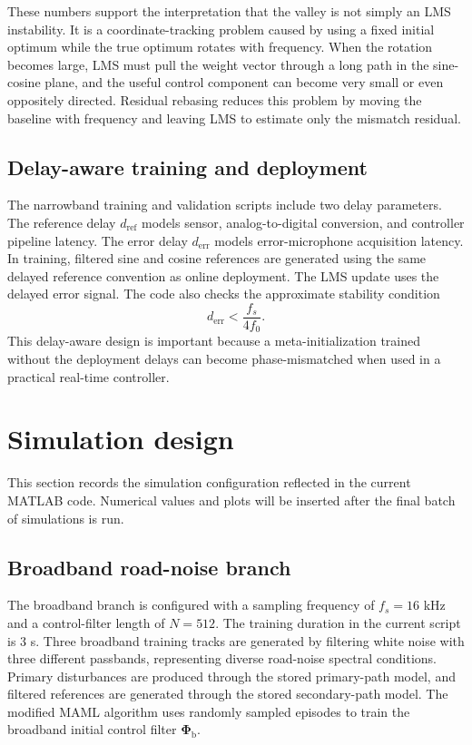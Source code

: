 \documentclass{internoise2026}
\begin{document}
These numbers support the interpretation that the valley is not simply an LMS instability. It is a coordinate-tracking problem caused by using a fixed initial optimum while the true optimum rotates with frequency. When the rotation becomes large, LMS must pull the weight vector through a long path in the sine-cosine plane, and the useful control component can become very small or even oppositely directed. Residual rebasing reduces this problem by moving the baseline with frequency and leaving LMS to estimate only the mismatch residual.

\subsection{Delay-aware training and deployment}

The narrowband training and validation scripts include two delay parameters. The reference delay $d_{\mathrm{ref}}$ models sensor, analog-to-digital conversion, and controller pipeline latency. The error delay $d_{\mathrm{err}}$ models error-microphone acquisition latency. In training, filtered sine and cosine references are generated using the same delayed reference convention as online deployment. The LMS update uses the delayed error signal. The code also checks the approximate stability condition
\begin{equation}
  d_{\mathrm{err}} < \frac{f_s}{4f_0}.
  \label{eq:delay_stability}
\end{equation}
This delay-aware design is important because a meta-initialization trained without the deployment delays can become phase-mismatched when used in a practical real-time controller.

\section{Simulation design}

This section records the simulation configuration reflected in the current MATLAB code. Numerical values and plots will be inserted after the final batch of simulations is run.

\subsection{Broadband road-noise branch}

The broadband branch is configured with a sampling frequency of $f_s=16$ kHz and a control-filter length of $N=512$. The training duration in the current script is 3 s. Three broadband training tracks are generated by filtering white noise with three different passbands, representing diverse road-noise spectral conditions. Primary disturbances are produced through the stored primary-path model, and filtered references are generated through the stored secondary-path model. The modified MAML algorithm uses randomly sampled episodes to train the broadband initial control filter $\boldsymbol{\Phi}_{\mathrm{b}}$.
\end{document}
